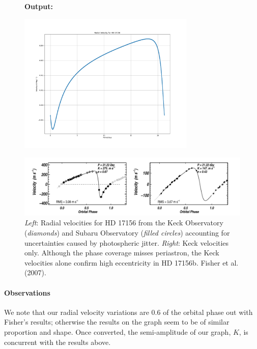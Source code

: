 \documentclass[11pt]{article}
\newcommand*{\figuretitle}[1]{
    	{\textbf{#1}
    	\par\vspace{-1em}}
    }
\begin{document}
\begin{figure}[H]
	\figuretitle{Output:}
	\centering
	\includegraphics[width=0.75\textwidth]{../matplotlib_graphs/radial_velocity_1.png}
\end{figure} 
    

\begin{figure}[!hbt]
	\centering 
	\includegraphics[width=\textwidth]{../images/radial_v_graph.png}
	\caption{{\it Left}: Radial velocities for HD 17156 from the Keck Observatory ({\it diamonds}) and Subaru Observatory ({\it filled circles}) accounting for uncertainties caused by photospheric jitter. {\it Right}: Keck velocities only. Although the phase coverage misses periastron, the Keck velocities alone confirm high eccentricity in HD 17156b. Fisher et al. (2007).} 
	\label{Figure 4.b}
\end{figure}



    \hypertarget{observations}{%
\paragraph{Observations}\label{observations_2}}

We note that our radial velocity variations are 0.6 of the orbital phase out with Fisher's results; otherwise the results on the graph seem to be of similar proportion and shape. Once converted, the semi-amplitude of our graph, \(K\), is concurrent with the results above.
\end{document}
